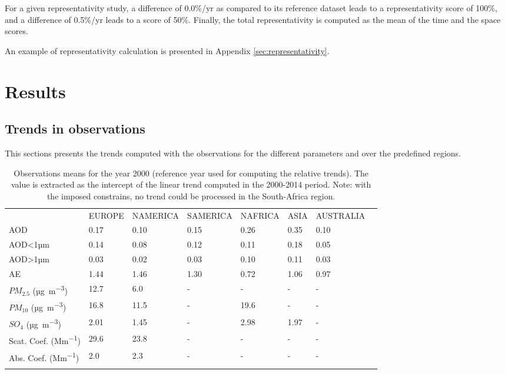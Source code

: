 \documentclass[journal abbreviation, manuscript]{copernicus}
\begin{document}
For a given representativity study, a difference of 0.0\%/yr as compared to its reference dataset leads to a representativity score of 100\%, and a difference of 0.5\%/yr leads to a score of 50\%.
Finally, the total representativity is computed as the mean of the time and the space scores.

An example of representativity calculation is presented in Appendix \ref{sec:representativity}.


\section{Results}

\subsection{Trends in observations}
This sections presents the trends computed with the observations for the different parameters and over the predefined regions.

\begin{table}
 \begin{tabular}{llllllll}
  \tophline
                                & EUROPE & NAMERICA & SAMERICA & NAFRICA & ASIA & AUSTRALIA \\
  \middlehline
  AOD                           & 0.17   & 0.10     & 0.15     & 0.26    & 0.35 & 0.10      \\
  AOD<1µm                       & 0.14   & 0.08     & 0.12     & 0.11    & 0.18 & 0.05      \\
  AOD>1µm                       & 0.03   & 0.02     & 0.03     & 0.10    & 0.11 & 0.03      \\
  AE                            & 1.44   & 1.46     & 1.30     & 0.72    & 1.06 & 0.97      \\
  $PM_{2.5}$ (\unit{µg.m^{-3}}) & 12.7   & 6.0      & -        & -       & -    & -         \\
  $PM_{10}$ (\unit{µg.m^{-3}})  & 16.8   & 11.5     & -        & 19.6    & -    & -         \\
  $SO_{4}$ (\unit{µg.m^{-3}})   & 2.01   & 1.45     & -        & 2.98    & 1.97 & -         \\
  Scat. Coef. (\unit{Mm^{-1}})  & 29.6   & 23.8     & -        & -       & -    & -         \\
  Abs. Coef. (\unit{Mm^{-1}})   & 2.0    & 2.3      & -        & -       & -    & -         \\
  \bottomhline
 \end{tabular}

 \caption{Observations means for the year 2000 (reference year used for computing the relative trends). The value is extracted as the intercept of the linear trend computed in the 2000-2014 period. Note: with the imposed constrains, no trend could be processed in the South-Africa region.}
 \label{table:obs_2000mean}
\end{table}
\end{document}
